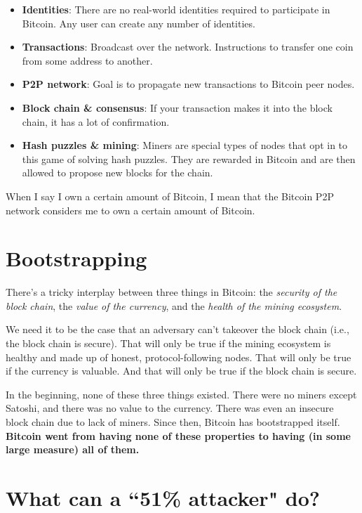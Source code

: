 \documentclass[12pt]{article}
\begin{document}
\begin{itemize}
\item \textbf{Identities}: There are no real-world identities required to participate in Bitcoin. Any user can create any number of identities.
\item \textbf{Transactions}: Broadcast over the network. Instructions to transfer one coin from some address to another.
\item \textbf{P2P network}: Goal is to propagate new transactions to Bitcoin peer nodes.
\item \textbf{Block chain \& consensus}: If your transaction makes it into the block chain, it has a lot of confirmation.
\item \textbf{Hash puzzles \& mining}: Miners are special types of nodes that opt in to this game of solving hash puzzles. They are rewarded in Bitcoin and are then allowed to propose new blocks for the chain.
\end{itemize}

When I say I own a certain amount of Bitcoin, I mean that the Bitcoin P2P network considers me to own a certain amount of Bitcoin.

\section*{Bootstrapping}

There's a tricky interplay between three things in Bitcoin: the \textit{security of the block chain}, the \textit{value of the currency}, and the \textit{health of the mining ecosystem}.

We need it to be the case that an adversary can't takeover the block chain (i.e., the block chain is secure). That will only be true if the mining ecosystem is healthy and made up of honest, protocol-following nodes. That will only be true if the currency is valuable. And that will only be true if the block chain is secure.

In the beginning, none of these three things existed. There were no miners except Satoshi, and there was no value to the currency. There was even an insecure block chain due to lack of miners. Since then, Bitcoin has bootstrapped itself. \textbf{Bitcoin went from having none of these properties to having (in some large measure) all of them.}

\section*{What can a ``51\% attacker" do?}
\end{document}
